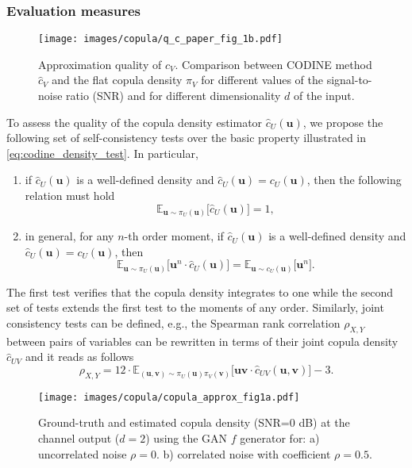 \subsubsection{Evaluation measures}
\label{subsec:codine_metrics}
\begin{figure}[t]
	\centering
	\texttt{[image: images/copula/q\_c\_paper\_fig\_1b.pdf]}
	\caption{Approximation quality of $c_V$. Comparison between CODINE method $\hat{c}_V$ and the flat copula density $\pi_V$ for different values of the signal-to-noise ratio (SNR) and for different dimensionality $d$ of the input.}
	\label{fig:codine_q_c}
\end{figure}
To assess the quality of the copula density estimator $\hat{c}_U(\mathbf{u})$, we propose the following set of self-consistency tests over the basic property illustrated in \eqref{eq:codine_density_test}. In particular,
\begin{enumerate}
\item if $\hat{c}_U(\mathbf{u})$ is a well-defined density and $\hat{c}_U(\mathbf{u})=c_U(\mathbf{u})$, then the following relation must hold
\begin{equation}
\mathbb{E}_{\mathbf{u} \sim \pi_{U}(\mathbf{u})}\bigl[\hat{c}_U(\mathbf{u})\bigr]=1,
\end{equation}
\item in general, for any $n$-th order moment, if $\hat{c}_U(\mathbf{u})$ is a well-defined density and $\hat{c}_U(\mathbf{u})=c_U(\mathbf{u})$, then
\begin{equation}
\mathbb{E}_{\mathbf{u} \sim \pi_{U}(\mathbf{u})}\bigl[\mathbf{u}^n\cdot \hat{c}_U(\mathbf{u})\bigr]=\mathbb{E}_{\mathbf{u} \sim c_{U}(\mathbf{u})}\bigl[\mathbf{u}^n\bigr].
\end{equation}
\end{enumerate}
The first test verifies that the copula density integrates to one while the second set of tests extends the first test to the moments of any order. Similarly, joint consistency tests can be defined, e.g., the Spearman rank correlation $\rho_{X,Y}$ between pairs of variables can be rewritten in terms of their joint copula density $\hat{c}_{UV}$ and it reads as follows
\begin{equation}
\rho_{X,Y} = 12 \cdot\mathbb{E}_{(\mathbf{u},\mathbf{v}) \sim \pi_{U}(\mathbf{u})\pi_{V}(\mathbf{v})}\bigl[\mathbf{u} \mathbf{v}\cdot \hat{c}_{UV}(\mathbf{u},\mathbf{v})\bigr]-3.
\end{equation}
\begin{figure}[t]
	\centering
	\texttt{[image: images/copula/copula\_approx\_fig1a.pdf]}
	\caption{Ground-truth and estimated copula density (SNR=$0$ dB) at the channel output ($d=2$) using the GAN $f$ generator for: a) uncorrelated noise $\rho=0$. b) correlated noise with coefficient $\rho=0.5$.}
	\label{fig:codine_copula_approx}
\end{figure}
